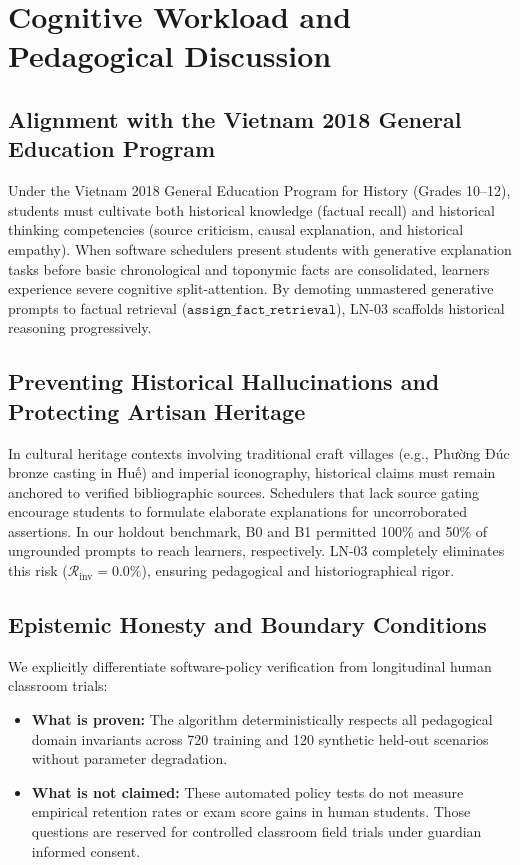\documentclass[11pt,a4paper]{article}
\begin{document}
\section{Cognitive Workload and Pedagogical Discussion}
\label{sec:discussion}

\subsection{Alignment with the Vietnam 2018 General Education Program}
Under the Vietnam 2018 General Education Program for History (Grades 10--12), students must cultivate both historical knowledge (factual recall) and historical thinking competencies (source criticism, causal explanation, and historical empathy). When software schedulers present students with generative explanation tasks before basic chronological and toponymic facts are consolidated, learners experience severe cognitive split-attention. By demoting unmastered generative prompts to factual retrieval ($\texttt{assign\_fact\_retrieval}$), LN-03 scaffolds historical reasoning progressively.

\subsection{Preventing Historical Hallucinations and Protecting Artisan Heritage}
In cultural heritage contexts involving traditional craft villages (e.g., Phường Đúc bronze casting in Huế) and imperial iconography, historical claims must remain anchored to verified bibliographic sources. Schedulers that lack source gating encourage students to formulate elaborate explanations for uncorroborated assertions. In our holdout benchmark, B0 and B1 permitted 100\% and 50\% of ungrounded prompts to reach learners, respectively. LN-03 completely eliminates this risk ($\mathcal{R}_{\text{inv}} = 0.0\%$), ensuring pedagogical and historiographical rigor.

\subsection{Epistemic Honesty and Boundary Conditions}
We explicitly differentiate software-policy verification from longitudinal human classroom trials:
\begin{itemize}[leftmargin=*]
    \item \textbf{What is proven:} The algorithm deterministically respects all pedagogical domain invariants across 720 training and 120 synthetic held-out scenarios without parameter degradation.
    \item \textbf{What is not claimed:} These automated policy tests do not measure empirical retention rates or exam score gains in human students. Those questions are reserved for controlled classroom field trials under guardian informed consent.
\end{itemize}
\end{document}
